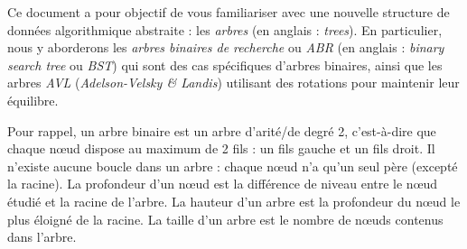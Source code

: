 \documentclass[11pt,a4paper,twoside]{article}
\begin{document}
\EncadreTitre

\bigskip


%
%

\bigskip


Ce document a pour objectif de vous familiariser avec une nouvelle structure de données algorithmique abstraite : les \textit{arbres} (en anglais : \textit{trees}).
En particulier, nous y aborderons les \textit{arbres binaires de recherche} ou \textit{ABR} (en anglais : \textit{binary search tree} ou \textit{BST}) qui sont des cas spécifiques d'arbres binaires, ainsi que les arbres \textit{AVL} (\textit{Adelson-Velsky \& Landis}) utilisant des rotations pour maintenir leur équilibre.

\bigskip

Pour rappel, un arbre binaire est un arbre d'arité/de degré 2, c'est-à-dire que chaque nœud dispose au maximum de 2 fils : un fils gauche et un fils droit.
Il n'existe aucune boucle dans un arbre : chaque nœud n'a qu'un seul père (excepté la racine).
La profondeur d'un nœud est la différence de niveau entre le nœud étudié et la racine de l'arbre.
La hauteur d'un arbre est la profondeur du nœud le plus éloigné de la racine.
La taille d'un arbre est le nombre de nœuds contenus dans l'arbre.

\bigskip


\end{document}
